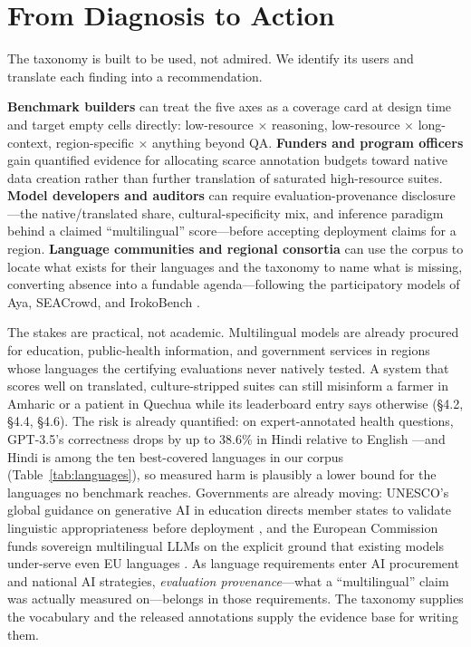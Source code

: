 \documentclass[letterpaper]{article} %
\begin{document}
\section{From Diagnosis to Action}
The taxonomy is built to be used, not admired. We identify its users and translate each finding into a recommendation.
 
\textbf{Benchmark builders} can treat the five axes as a coverage card at design time and target empty cells directly: low-resource $\times$ reasoning, low-resource $\times$ long-context, region-specific $\times$ anything beyond QA. \textbf{Funders and program officers} gain quantified evidence for allocating scarce annotation budgets toward native data creation rather than further translation of saturated high-resource suites. \textbf{Model developers and auditors} can require evaluation-provenance disclosure---the native/translated share, cultural-specificity mix, and inference paradigm behind a claimed ``multilingual'' score---before accepting deployment claims for a region. \textbf{Language communities and regional consortia} can use the corpus to locate what exists for their languages and the taxonomy to name what is missing, converting absence into a fundable agenda---following the participatory models of Aya, SEACrowd, and IrokoBench \cite{singh2024aya,lovenia2024seacrowd,adelani2024irokobench}.
 
The stakes are practical, not academic. Multilingual models are already procured for education, public-health information, and government services in regions whose languages the certifying evaluations never natively tested. A system that scores well on translated, culture-stripped suites can still misinform a farmer in Amharic or a patient in Quechua while its leaderboard entry says otherwise (\S4.2, \S4.4, \S4.6). The risk is already quantified: on expert-annotated health questions, GPT-3.5's correctness drops by up to 38.6\% in Hindi relative to English \cite{jin2024better}---and Hindi is among the ten best-covered languages in our corpus (Table~\ref{tab:languages}), so measured harm is plausibly a lower bound for the languages no benchmark reaches. Governments are already moving: UNESCO's global guidance on generative AI in education directs member states to validate linguistic appropriateness before deployment \cite{miao2023guidance}, and the European Commission funds sovereign multilingual LLMs on the explicit ground that existing models under-serve even EU languages \cite{ec2025openeurollm}. As language requirements enter AI procurement and national AI strategies, \emph{evaluation provenance}---what a ``multilingual'' claim was actually measured on---belongs in those requirements. The taxonomy supplies the vocabulary and the released annotations supply the evidence base for writing them.
 
\end{document}
